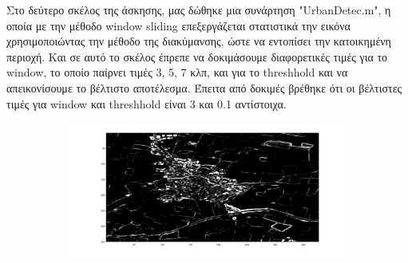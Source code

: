 \documentclass{article}
\begin{document}
	\pagebreak
	\noindent                                                                                   
	Στο δεύτερο σκέλος της άσκησης, μας δώθηκε μια συνάρτηση "UrbanDetec.m", η οποία με την μέθοδο window sliding επεξεργάζεται στατιστικά την εικόνα χρησιμοποιώντας την μέθοδο της διακύμανσης, ώστε να εντοπίσει την κατοικημένη περιοχή. Και σε αυτό το σκέλος έπρεπε να δοκιμάσουμε διαφορετικές τιμές για το window, το οποίο παίρνει τιμές 3, 5, 7 κλπ, και για το threshhold και να απεικονίσουμε το βέλτιστο αποτέλεσμα. Έπειτα από δοκιμές βρέθηκε ότι οι βέλτιστες τιμές για window και threshhold είναι 3 και 0.1 αντίστοιχα.

	\begin{figure}[h!]
		\centering
		\begin{subfigure}[t]{0.5\textwidth}
			\centering
			\includegraphics[height=\linewidth, width=\linewidth]{./output_images/lab6_step2a.jpg}
		\end{subfigure}%
		~
		\begin{subfigure}[t]{0.5\textwidth}
			\centering

\end{subfigure}
\end{figure}
\end{document}
